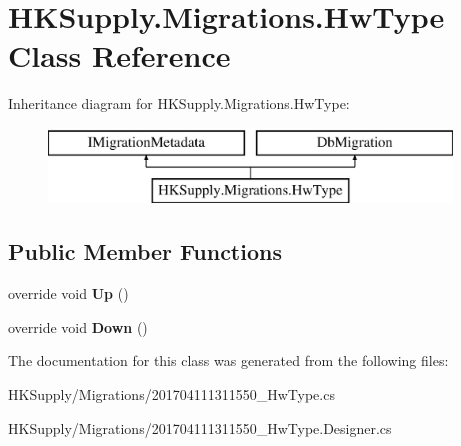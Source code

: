 \hypertarget{class_h_k_supply_1_1_migrations_1_1_hw_type}{}\section{H\+K\+Supply.\+Migrations.\+Hw\+Type Class Reference}
\label{class_h_k_supply_1_1_migrations_1_1_hw_type}
Inheritance diagram for H\+K\+Supply.\+Migrations.\+Hw\+Type\+:\begin{figure}[H]
\begin{center}
\leavevmode
\includegraphics[height=2.000000cm]{class_h_k_supply_1_1_migrations_1_1_hw_type}
\end{center}
\end{figure}
\subsection*{Public Member Functions}
\begin{DoxyCompactItemize}
\item 
\mbox{\label{class_h_k_supply_1_1_migrations_1_1_hw_type_a4eff483ade00831a0988a8820118b804}} 
override void {\bfseries Up} ()
\item 
\mbox{\label{class_h_k_supply_1_1_migrations_1_1_hw_type_a70301486d03894d59b84e00fbc895e4c}} 
override void {\bfseries Down} ()
\end{DoxyCompactItemize}


The documentation for this class was generated from the following files\+:\begin{DoxyCompactItemize}
\item 
H\+K\+Supply/\+Migrations/201704111311550\+\_\+\+Hw\+Type.\+cs\item 
H\+K\+Supply/\+Migrations/201704111311550\+\_\+\+Hw\+Type.\+Designer.\+cs\end{DoxyCompactItemize}
